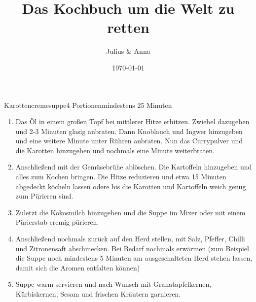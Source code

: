 \documentclass{article}
\title{Das Kochbuch um die Welt zu retten}
\author{Julius \& Anna}
\date{\today}
\begin{document}
\maketitle

\begin{recipe}{Karottencremesuppe}{4 Portionen}{mindestens 25 Minuten}
\begin{enumerate}
  \item Das Öl in einem großen Topf bei mittlerer Hitze erhitzen. Zwiebel dazugeben und 2-3 Minuten glasig anbraten. Dann Knoblauch und Ingwer hinzugeben und eine weitere Minute unter Rühren anbraten. Nun das Currypulver und die Karotten hinzugeben und nochmals eine Minute weiterbraten.
  \item Anschließend mit der Gemüsebrühe ablöschen. Die Kartoffeln hinzugeben und alles zum Kochen bringen. Die Hitze reduzieren und etwa 15 Minuten abgedeckt köcheln lassen odere bis die Karotten und Kartoffeln weich genug zum Pürieren sind.
  \item Zuletzt die Kokosmilch hinzugeben und die Suppe im Mixer oder mit einem Pürierstab cremig pürieren.
  \item Anschließend nochmals zurück auf den Herd stellen, mit Salz, Pfeffer, Chilli und Zitronensaft abschmecken. Bei Bedarf nochmals erwärmen (zum Beispiel die Suppe noch mindestens 5 Minuten am ausgeschalteten Herd stehen lassen, damit sich die Aromen entfalten können)
  \item Suppe warm servieren und nach Wunsch mit Granatapfelkernen, Kürbiskernen, Sesam und frischen Kräutern garnieren.

\end{enumerate}
\end{recipe}
\end{document}
